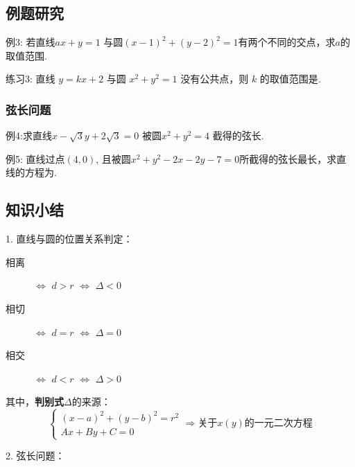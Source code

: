 \documentclass[10pt,a4paper]{article}
\begin{document}
\subsection{例题研究}

			\textcolor[rgb]{0.15,0.7,0.15}{例3: }若直线$ax+y=1$ 与圆$(x-1)^2+(y-2)^2=1$有两个不同的交点，求$a$的取值范围.\\\vspace{10pt}

			\textcolor[rgb]{0.15,0.7,0.15}{练习3: }直线 $y=kx+2$ 与圆 $x^2+y^2=1$ 没有公共点，则 $k$ 的取值范围是\underline{\hspace{25pt}}.

			\subsubsection{弦长问题}

			\textcolor[rgb]{0.15,0.7,0.15}{例4:}求直线$x-\sqrt{3}y+2\sqrt{3}=0$ 被圆$x^2+y^2=4$ 截得的弦长.
			\vspace{42pt}

			\textcolor[rgb]{0.15,0.7,0.15}{例5: } 直线过点$(4,0)$, 且被圆$x^2+y^2-2x-2y-7=0$所截得的弦长最长，求直线的方程为.\vspace{40pt}

\subsection{知识小结}
1. 直线与圆的位置关系判定：
\begin{description}
	\item[相离] $\Longleftrightarrow$ $d>r$ $\Longleftrightarrow$ $\Delta < 0$
	\item[相切] $\Longleftrightarrow$ $d=r$ $\Longleftrightarrow$ $\Delta = 0$
	\item[相交] $\Longleftrightarrow$ $d<r$ $\Longleftrightarrow$ $\Delta > 0$
\end{description}

其中，\textbf{判别式$\Delta$}的来源：
\[\left\{ \begin{array}{l}
(x-a)^2+(y-b)^2=r^2 \\
Ax+By+C=0
\end{array} \right.
\Longrightarrow
\textbf{关于$x(y)$的一元二次方程}\]

2. 弦长问题：\vspace{22pt}
\end{document}
